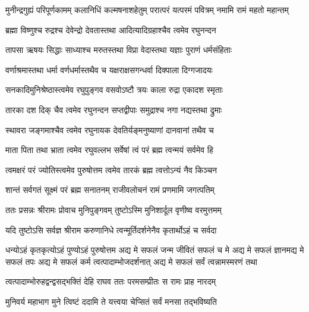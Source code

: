 \fourlineindentedshloka
{मुनीन्द्रगुह्यं परिपूर्णकामम्}
{कलानिधिं कल्मषनाशहेतुम्}
{परात्परं यत्परमं पवित्रम्}
{नमामि रामं महतो महान्तम्}%

\twolineshloka
{ब्रह्मा विष्णुश्च रुद्रश्च देवेन्द्रो देवतास्तथा}
{आदित्यादिग्रहाश्चैव त्वमेव रघुनन्दन}%

\twolineshloka
{तापसा ऋषयः सिद्धाः साध्याश्च मरुतस्तथा}
{विप्रा वेदास्तथा यज्ञाः पुराणं धर्मसंहिताः}%

\twolineshloka
{वर्णाश्रमास्तथा धर्मा वर्णधर्मास्तथैव च}
{यक्षराक्षसगन्धर्वा दिक्पाला दिग्गजादयः}%

\twolineshloka
{सनकादिमुनिश्रेष्ठास्त्वमेव रघुपुङ्गव}
{वसवोऽष्टौ त्रयः काला रुद्रा एकादश स्मृताः}%

\twolineshloka
{तारका दश दिक् चैव त्वमेव रघुनन्दन}
{सप्तद्वीपाः समुद्राश्च नगा नद्यस्तथा द्रुमाः}%

\twolineshloka
{स्थावरा जङ्गमाश्चैव त्वमेव रघुनायक}
{देवतिर्यङ्मनुष्याणां दानवानां तथैव च}%

\twolineshloka
{माता पिता तथा भ्राता त्वमेव रघुवल्लभ}
{सर्वेषां त्वं परं ब्रह्म त्वन्मयं सर्वमेव हि}%

\twolineshloka
{त्वमक्षरं परं ज्योतिस्त्वमेव पुरुषोत्तम}
{त्वमेव तारकं ब्रह्म त्वत्तोऽन्यं नैव किञ्चन}%

\twolineshloka
{शान्तं सर्वगतं सूक्ष्मं परं ब्रह्म सनातनम्}
{राजीवलोचनं रामं प्रणमामि जगत्पतिम्}%


\twolineshloka
{ततः प्रसन्नः श्रीरामः प्रोवाच मुनिपुङ्गवम्}
{तुष्टोऽस्मि मुनिशार्दूल वृणीष्व वरमुत्तमम्}%


\twolineshloka
{यदि तुष्टोऽसि सर्वज्ञ श्रीराम करुणानिधे}
{त्वन्मूर्तिदर्शनेनैव कृतार्थोऽहं च सर्वदा}%

\threelineshloka
{धन्योऽहं कृतकृत्योऽहं पुण्योऽहं पुरुषोत्तम}
{अद्य मे सफलं जन्म जीवितं सफलं च मे}%
{अद्य मे सफलं ज्ञानमद्य मे सफलं तपः}
\twolineshloka
{अद्य मे सफलं कर्म त्वत्पादाम्भोजदर्शनात्}
{अद्य मे सफलं सर्वं त्वन्नामस्मरणं तथा}%

\twolineshloka
{त्वत्पादाम्भोरुहद्वन्द्वसद्भक्तिं देहि राघव}
{ततः परमसम्प्रीतः स रामः प्राह नारदम्}%


\twolineshloka
{मुनिवर्य महाभाग मुने त्विष्टं ददामि ते}
{यत्त्वया चेप्सितं सर्वं मनसा तद्भविष्यति}%


